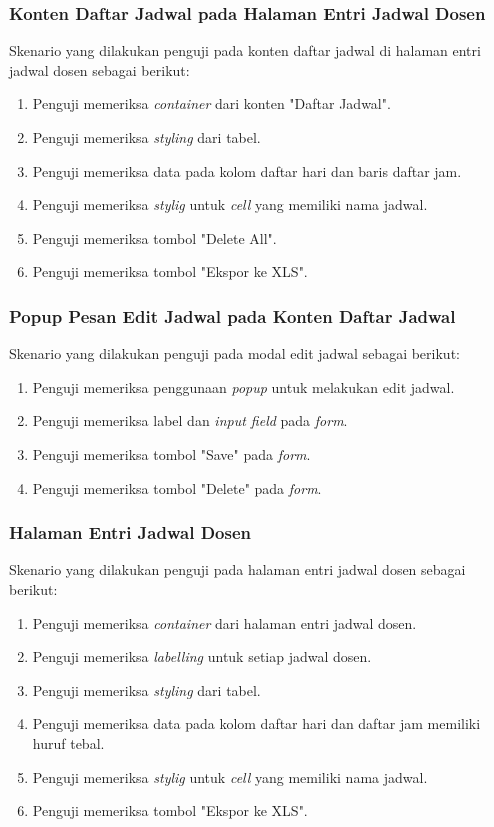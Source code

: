 \subsubsection{Konten Daftar Jadwal pada Halaman Entri Jadwal Dosen}
Skenario yang dilakukan penguji pada konten daftar jadwal di halaman entri jadwal dosen sebagai berikut:
\begin{enumerate}
	\item Penguji memeriksa \textit{container} dari konten "Daftar Jadwal".
	\item Penguji memeriksa \textit{styling} dari tabel.	
	\item Penguji memeriksa data pada kolom daftar hari dan baris daftar jam.
	\item Penguji memeriksa \textit{stylig} untuk \textit{cell} yang memiliki nama jadwal.			
	\item Penguji memeriksa tombol "Delete All".
	\item Penguji memeriksa tombol "Ekspor ke XLS".
\end{enumerate}

\subsubsection{Popup Pesan Edit Jadwal pada Konten Daftar Jadwal}
Skenario yang dilakukan penguji pada modal edit jadwal sebagai berikut:
\begin{enumerate}
	\item Penguji memeriksa penggunaan \textit{popup} untuk melakukan edit jadwal.
	\item Penguji memeriksa label dan \textit{input field} pada \textit{form}. 
	\item Penguji memeriksa tombol "Save" pada \textit{form}.
	\item Penguji memeriksa tombol "Delete" pada \textit{form}.
\end{enumerate}

\subsubsection{Halaman Entri Jadwal Dosen}
Skenario yang dilakukan penguji pada halaman entri jadwal dosen sebagai berikut:
\begin{enumerate}
	\item Penguji memeriksa \textit{container} dari halaman entri jadwal dosen.
	\item Penguji memeriksa \textit{labelling} untuk setiap jadwal dosen.
	\item Penguji memeriksa \textit{styling} dari tabel.	
	\item Penguji memeriksa data pada kolom daftar hari dan daftar jam  memiliki huruf tebal.
	\item Penguji memeriksa \textit{stylig} untuk \textit{cell} yang memiliki nama jadwal.
	\item Penguji memeriksa tombol "Ekspor ke XLS".
\end{enumerate}

